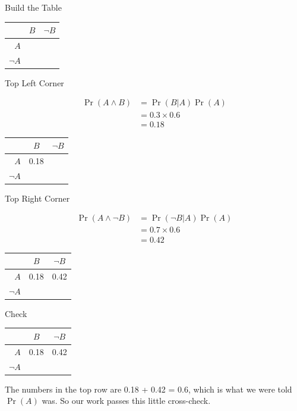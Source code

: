 \documentclass[
  ignorenonframetext,
]{beamer}
\renewcommand{\,}{\text{, }}
\begin{document}
\begin{frame}{Build the Table}
\protect\hypertarget{build-the-table}{}

\begin{longtable}[]{@{}rcc@{}}
\toprule
& \(B\) & \(\neg B\)\tabularnewline
\midrule
\endhead
\(A\) & &\tabularnewline
\(\neg A\) & &\tabularnewline
\bottomrule
\end{longtable}

\end{frame}

\begin{frame}{Top Left Corner}
\protect\hypertarget{top-left-corner}{}

\begin{align*}
\Pr(A \wedge B) &= \Pr(B | A) \Pr(A) \\
 &= 0.3 \times 0.6 \\
 &= 0.18
\end{align*}

\pause

\begin{longtable}[]{@{}rcc@{}}
\toprule
& \(B\) & \(\neg B\)\tabularnewline
\midrule
\endhead
\(A\) & 0.18 &\tabularnewline
\(\neg A\) & &\tabularnewline
\bottomrule
\end{longtable}

\end{frame}

\begin{frame}{Top Right Corner}
\protect\hypertarget{top-right-corner}{}

\begin{align*}
\Pr(A \wedge \neg B) &= \Pr(\neg B | A) \Pr(A) \\
 &= 0.7 \times 0.6 \\
 &= 0.42
\end{align*}

\pause

\begin{longtable}[]{@{}rcc@{}}
\toprule
& \(B\) & \(\neg B\)\tabularnewline
\midrule
\endhead
\(A\) & 0.18 & 0.42\tabularnewline
\(\neg A\) & &\tabularnewline
\bottomrule
\end{longtable}

\end{frame}

\begin{frame}{Check}
\protect\hypertarget{check}{}

\begin{longtable}[]{@{}rcc@{}}
\toprule
& \(B\) & \(\neg B\)\tabularnewline
\midrule
\endhead
\(A\) & 0.18 & 0.42\tabularnewline
\(\neg A\) & &\tabularnewline
\bottomrule
\end{longtable}

The numbers in the top row are 0.18 + 0.42 = 0.6, which is what we were
told \(\Pr(A)\) was. So our work passes this little cross-check.

\end{frame}
\end{document}
